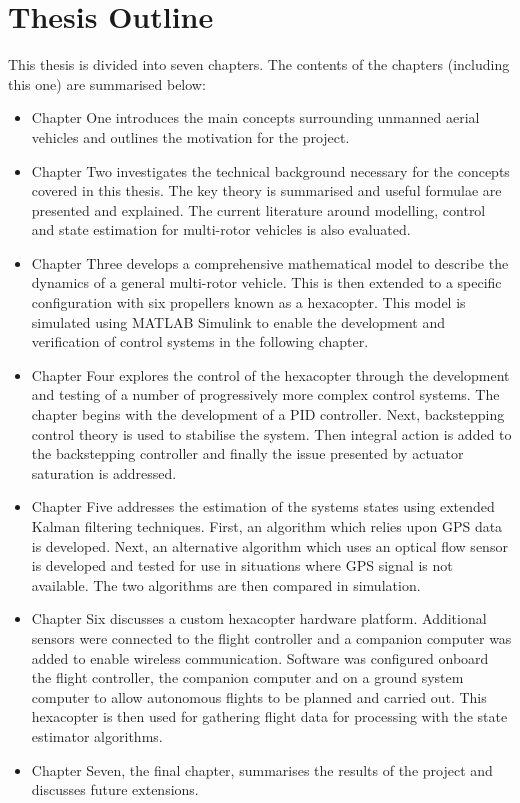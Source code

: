 \section{Thesis Outline}
This thesis is divided into seven chapters. The contents of the chapters (including this one) are summarised below:
\begin{itemize}
\item Chapter One introduces the main concepts surrounding unmanned aerial vehicles and outlines the motivation for the project.
\item Chapter Two investigates the technical background necessary for the concepts covered in this thesis. The key theory is summarised and useful formulae are presented and explained. The current literature around modelling, control and state estimation for multi-rotor vehicles is also evaluated.
\item Chapter Three develops a comprehensive mathematical model to describe the dynamics of a general multi-rotor vehicle. This is then extended to a specific configuration  with six propellers known as a hexacopter. This model is simulated using MATLAB Simulink to enable the development and verification of control systems in the following chapter.
\item Chapter Four explores the control of the hexacopter through the development and testing of a number of progressively more complex control systems. The chapter begins with the development of a PID controller. Next, backstepping control theory is used to stabilise the system. Then integral action is added to the backstepping controller and finally the issue presented by actuator saturation is addressed.
\item Chapter Five addresses the estimation of the systems states using extended Kalman filtering techniques. First, an algorithm which relies upon GPS data is developed. Next, an alternative algorithm which uses an optical flow sensor is developed and tested for use in situations where GPS signal is not available. The two algorithms are then compared in simulation.
\item Chapter Six discusses a custom hexacopter hardware platform. Additional sensors were connected to the flight controller and a companion computer was added to enable wireless communication. Software was configured onboard the flight controller, the companion computer and on a ground system computer to allow autonomous flights to be planned and carried out. This hexacopter is then used for gathering flight data for processing with the state estimator algorithms.
\item Chapter Seven, the final chapter, summarises the results of the project and discusses future extensions.
\end{itemize}

\clearpage


